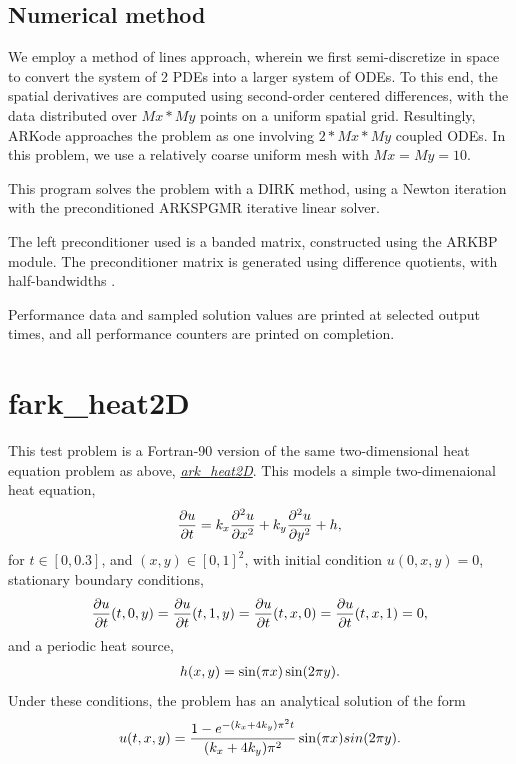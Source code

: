 \documentclass[letterpaper,10pt,english]{sphinxmanual}
\begin{document}
\section{Numerical method}
\label{fark_diurnal_kry_bp:numerical-method}
We employ a method of lines approach, wherein we first
semi-discretize in space to convert the system of 2 PDEs into a larger
system of ODEs.  To this end, the spatial derivatives are computed
using second-order centered differences, with the data distributed
over $Mx*My$ points on a uniform spatial grid.  Resultingly, ARKode
approaches the problem as one involving $2*Mx*My$ coupled ODEs.
In this problem, we use a relatively coarse uniform mesh with
$Mx=My=10$.

This program solves the problem with a DIRK method, using a Newton
iteration with the preconditioned ARKSPGMR iterative linear solver.

The left preconditioner used is a banded matrix, constructed using
the ARKBP module.  The preconditioner matrix is generated using
difference quotients, with half-bandwidths .

Performance data and sampled solution values are printed at
selected output times, and all performance counters are printed
on completion.


\chapter{fark\_heat2D}
\label{fark_heat2D:fark-heat2d}\label{fark_heat2D::doc}\label{fark_heat2D:id1}
This test problem is a Fortran-90 version of the same two-dimensional
heat equation problem as above, {\hyperref[ark_heat2D:ark-heat2d]{\emph{ark\_heat2D}}}.  This models a
simple two-dimenaional heat equation,
\begin{gather}
\begin{split}\frac{\partial u}{\partial t} = k_x \frac{\partial^2 u}{\partial x^2}
                              + k_y \frac{\partial^2 u}{\partial y^2} + h,\end{split}\notag
\end{gather}
for $t \in [0, 0.3]$, and $(x,y) \in [0, 1]^2$, with initial
condition $u(0,x,y) = 0$, stationary boundary conditions,
\begin{gather}
\begin{split}\frac{\partial u}{\partial t}(t,0,y) = \frac{\partial u}{\partial t}(t,1,y) =
\frac{\partial u}{\partial t}(t,x,0) = \frac{\partial u}{\partial t}(t,x,1) = 0,\end{split}\notag
\end{gather}
and a periodic heat source,
\begin{gather}
\begin{split}h(x,y) = \sin(\pi x) \sin(2\pi y).\end{split}\notag
\end{gather}
Under these conditions, the problem has an analytical solution of the
form
\begin{gather}
\begin{split}u(t,x,y) = \frac{1 - e^{-(k_x+4k_y)\pi^2 t}}{(k_x+4k_y)\pi^2} \sin(\pi x) sin(2\pi y).\end{split}\notag
\end{gather}
\end{document}

